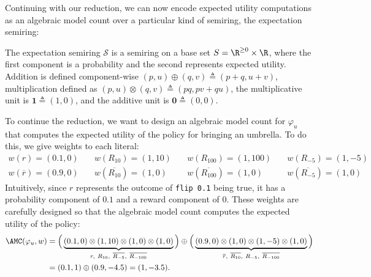 
Continuing with our reduction,
we can now encode expected utility computations as an algebraic model count
over a particular kind of semiring, the expectation semiring:

\begin{definition}
\label{def:expectation semiring}
  The expectation semiring
  $\mathcal S$
  is a semiring on a base set $S = \R^{\geq 0} \times \R$, where the first component
  is a probability and the second represents expected utility.
  Addition is defined component-wise $(p,u) \oplus (q,v) \triangleq (p+q, u+v)$,
  multiplication defined as $(p,u) \otimes (q,v) \triangleq (pq, pv+qu)$,
  the multiplicative unit is $\mathbf{1} \triangleq (1,0)$,
  and the additive unit is $\mathbf{0} \triangleq (0,0)$.
\end{definition}

To continue the reduction, we want to design an algebraic model count for
$\varphi_u$ that computes the expected utility of the policy for bringing an
umbrella. To do this, we give weights to each literal:
\begin{align*}
  w(r) = (0.1, 0) \quad& w(R_{10}) = (1, 10) \quad& w(R_{100}) = (1, 100) \quad& w(R_{-5}) = (1, -5)\\
  w(\overline{r}) = (0.9, 0) \quad& w(\overline{R_{10}}) = (1, 0) \quad& w(\overline{R_{100}}) = (1, 0) \quad& w(\overline{R_{-5}}) = (1, 0)
\end{align*}
Intuitively, since $r$ represents the outcome of \texttt{flip 0.1} being true, it has a
probability component of $0.1$ and a reward component of 0.
These weights are carefully designed so that the algebraic model count computes
the expected utility of the policy:
\begin{align}
  \AMC(\varphi_u, w)
  &= \Big(\underbrace{(0.1,0)  \otimes (1,10) \otimes (1, 0) \otimes (1, 0)}_{r,\ R_{10},\ \overline{R_{-5}},\ \overline{R_{-100}}} \Big)
  \oplus \Big(\underbrace{ (0.9,0) \otimes  (1, 0) \otimes(1,-5) \otimes (1, 0)}_{\overline{r},\ \overline{R_{10}},\ R_{-5},\ \overline{R_{-100}}}\Big) \nonumber \\
  & = (0.1, 1) \oplus (0.9, -4.5) = (1, -3.5).
  \label{eq:ex-amc}
\end{align}

